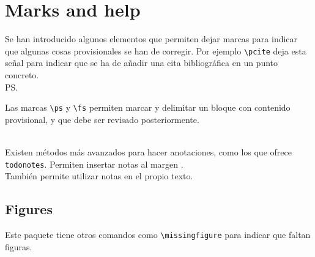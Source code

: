 \chapter{Marks and help}

Se han introducido algunos elementos que permiten dejar marcas para indicar que algunas cosas provisionales se han de corregir. Por ejemplo \verb+\pcite+ deja esta señal \pcite para indicar que se ha de añadir una cita bibliográfica en un punto concreto. \\

\ps

Las marcas \verb+\ps+ y \verb+\fs+ permiten marcar y delimitar un bloque con contenido provisional, y que debe ser revisado posteriormente.

\fs \\


Existen métodos más avanzados para hacer anotaciones, como los que ofrece \verb+todonotes+. Permiten insertar notas al margen .  \\

También  permite utilizar notas en el propio texto.    


\section{Figures}

Este paquete tiene otros comandos como \verb+\missingfigure+ para indicar que faltan figuras. \\

